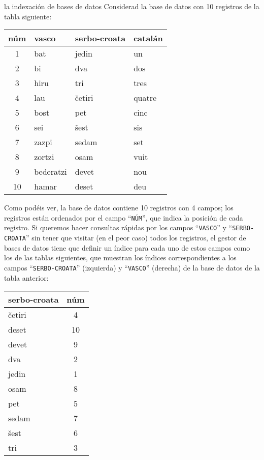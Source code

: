 \begin{persabermes}{la indexación de bases de datos}
Considerad la base de datos con 10 registros de la tabla siguiente: \begin{center} \begin{tabular}{clll} \hline

{\sc núm} &{\sc vasco} &{\sc serbo-croata} &{\sc catalán} \\ \hline \hline

1 &bat &jedin &un \\ 2 &bi &dva &dos \\ 3 &hiru &tri &tres \\ 4 &lau &\v{c}etiri &quatre \\ 5 &bost &pet &cinc \\ 6 &sei &\v{s}est &sis \\ 7 &zazpi &sedam &set \\ 8 &zortzi &osam &vuit \\ 9 &bederatzi &devet &nou \\ 10 &hamar &deset &deu \\ \hline

\end{tabular} \end{center} 

Como podéis ver, la base de datos contiene 10 registros con 4 campos; los registros están ordenados por el campo ``\texttt{NÚM}'', que indica la posición de cada registro. Si queremos hacer consultas rápidas por los campos ``\texttt{VASCO}'' y ``\texttt{SERBO-CROATA}'' sin tener que visitar (en el peor caso) todos los registros, el gestor de bases de datos tiene que definir un índice para cada uno de estos campos como los de las tablas siguientes, que muestran los índices correspondientes a los campos ``\texttt{SERBO-CROATA}'' (izquierda) y ``\texttt{VASCO}'' (derecha) de la base de datos de la tabla anterior: \begin{center} \parbox{0.25\textwidth}{ \begin{tabular}{lc} \hline

{\sc serbo-croata} &{\sc núm} \\ \hline

\hline

\v{c}etiri &4 \\ deset &10 \\ devet &9 \\ dva &2 \\ jedin &1 \\ osam &8 \\ pet &5 \\ sedam &7 \\ \v{s}est &6 \\ tri &3 \\ \hline


\end{tabular}}
\end{center}
\end{persabermes}
